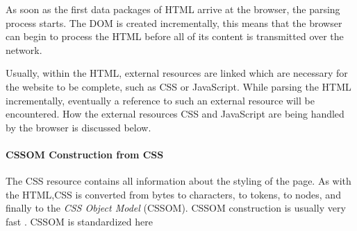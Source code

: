 


As soon as the first data packages of HTML arrive at the browser, the parsing process starts. %
The DOM is created incrementally,  this means that the browser can begin to process the HTML before all of its content is transmitted over the network.



Usually, within the HTML, external resources are linked which are necessary for the website to be complete, such as CSS or JavaScript.
While parsing the HTML incrementally, eventually a reference to such an external resource will be encountered.
How the external resources CSS and JavaScript are being handled by the browser is discussed below.









\paragraph{CSSOM Construction from CSS}



The CSS resource contains all information about the styling of the page.
As with the HTML,CSS is converted from bytes to characters, to tokens, to nodes, and finally to the \textit{CSS Object Model} (CSSOM). %
CSSOM construction is usually very fast . %
CSSOM is standardized here %

